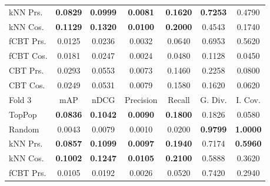 \begin{table}[hbt]
\begin{tabulary}{\textwidth}{|L|CCCCCC|}
kNN Prs. & \textbf{0.0829} &  \textbf{0.0999} &  \textbf{0.0081} &  \textbf{0.1620} &                                  \textbf{0.7253} &                                            0.4790 \\
kNN Cos. & \textbf{0.1129} &  \textbf{0.1320} &  \textbf{0.0100} &  \textbf{0.2000} &                                           0.4543 &                                            0.1740 \\
fCBT Prs. & 0.0125 &           0.0236 &           0.0032 &           0.0640 &                                           0.6953 &                                            0.5620 \\
fCBT Cos. & 0.0181 &           0.0247 &           0.0024 &           0.0480 &                                           0.1128 &                                            0.0450 \\
CBT Prs. & 0.0293 &           0.0553 &           0.0073 &           0.1460 &                                           0.2258 &                                            0.0800 \\
CBT Cos. & 0.0249 &           0.0531 &           0.0079 &           0.1580 &                                           0.1620 &                                            0.0620 \\
\hline
\hline
Fold 3 & mAP & nDCG & Precision & Recall & G. Div. & I. Cov. \\
\hline
TopPop & \textbf{0.0836} &  \textbf{0.1042} &  \textbf{0.0090} &  \textbf{0.1800} &                                           0.1826 &                                            0.0580 \\
Random & 0.0043 &           0.0079 &           0.0010 &           0.0200 &                                  \textbf{0.9799} &                                   \textbf{1.0000} \\
kNN Prs. & \textbf{0.0857} &  \textbf{0.1099} &  \textbf{0.0097} &  \textbf{0.1940} &                                           0.7174 &                                   \textbf{0.5960} \\
kNN Cos. & \textbf{0.1002} &  \textbf{0.1247} &  \textbf{0.0105} &  \textbf{0.2100} &                                           0.5888 &                                            0.3620 \\
fCBT Prs. & 0.0105 &           0.0192 &           0.0026 &           0.0520 &                                           0.7420 &                                            0.2940 \\

\end{tabulary}
\end{table}
